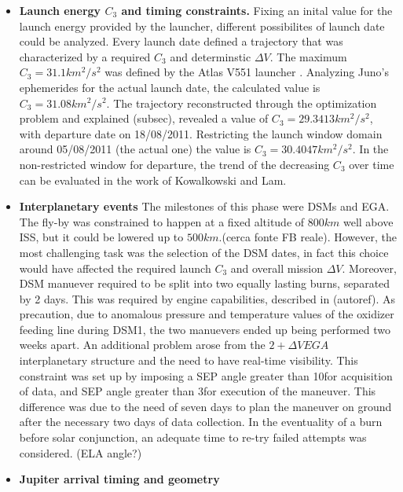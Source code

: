 \begin{itemize}
    \item \textbf{Launch energy $C_3$ and timing constraints.} Fixing an inital value for the launch energy provided by the launcher, different possibilites of launch date could be analyzed. Every launch date defined a trajectory that was characterized by a required $C_3$ and determinstic $\Delta V$. The maximum $C_3 = 31.1 km^2 / s^2$ was defined by the Atlas V551 launcher \cite{atlasV_juno}. Analyzing Juno's ephemerides for the actual launch date, the calculated value is $C_3 = 31.08 km^2 / s^2$. The trajectory reconstructed through the optimization problem and explained (subsec), revealed a value of $C_3 =  29.3413 km^2 / s^2$, with departure date on 18/08/2011. Restricting the launch window domain around 05/08/2011 (the actual one) the value is $C_3 = 30.4047 km^2 / s^2$. In the non-restricted window for departure, the trend of the decreasing $C_3$ over time can be evaluated in the work of Kowalkowski and Lam\cite{launch_period}.
    \item \textbf{Interplanetary events} The milestones of this phase were DSMs and EGA. The fly-by was constrained to happen at a fixed altitude of $800 km$ well above ISS, but it could be lowered up to $500km$.(cerca fonte FB reale). However, the most challenging task was the selection of the DSM dates, in fact this choice would have affected the required launch $C_3$ and overall mission $\Delta V$. Moreover, DSM manuever required to be split into two equally lasting burns, separated by 2 days. This was required by engine capabilities, described in (autoref). As precaution, due to anomalous pressure and temperature values of the oxidizer feeding line during DSM1, the two manuevers ended up being performed two weeks apart. An additional problem arose from the $2+\Delta V EGA$ interplanetary structure and the need to have real-time visibility. This constraint was set up by imposing a SEP angle greater than 10\textdegree \;for acquisition of data, and SEP angle greater than 3\textdegree \;for execution of the maneuver. This difference was due to the need of seven days to plan the maneuver on ground after the necessary two days of data collection. In the eventuality of a burn before solar conjunction, an adequate time to re-try failed attempts was considered. (ELA angle?)
    \item \textbf{Jupiter arrival timing and geometry}
\end{itemize}
 












\cite{fact_sheet}
